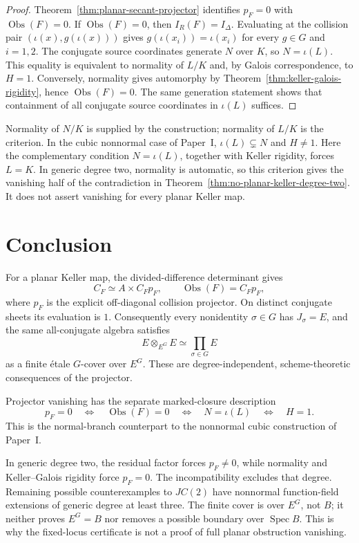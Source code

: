 \documentclass[11pt]{article}
\DeclareMathOperator{\Spec}{Spec}\DeclareMathOperator{\Frac}{Frac}
\newcommand{\Obs}{\operatorname{Obs}}
\begin{document}
\begin{proof}
Theorem~\ref{thm:planar-secant-projector} identifies \(p_F=0\) with
\(\Obs(F)=0\).  If \(\Obs(F)=0\), then \(I_R(F)=I_\Delta\).
Evaluating at the collision pair \((\iota(x),g(\iota(x)))\) gives
\(g(\iota(x_i))=\iota(x_i)\) for every \(g\in G\) and \(i=1,2\).
The conjugate source coordinates generate \(N\) over \(K\), so
\(N=\iota(L)\).  This equality is equivalent to normality of \(L/K\)
and, by Galois correspondence, to \(H=1\).  Conversely, normality gives
automorphy by Theorem~\ref{thm:keller-galois-rigidity}, hence
\(\Obs(F)=0\).  The same generation statement shows that containment
of all conjugate source coordinates in \(\iota(L)\) suffices.
\end{proof}

Normality of \(N/K\) is supplied by the construction; normality of
\(L/K\) is the criterion.  In the cubic nonnormal case of Paper~I,
\(\iota(L)\subsetneq N\) and \(H\ne1\).  Here the complementary
condition \(N=\iota(L)\), together with Keller rigidity, forces
\(L=K\).  In generic degree two, normality is automatic, so this
criterion gives the vanishing half of the contradiction in
Theorem~\ref{thm:no-planar-keller-degree-two}.  It does not assert
vanishing for every planar Keller map.

\section{Conclusion}
\label{sec:conclusion}

For a planar Keller map, the divided-difference determinant gives
\[
  C_F\simeq A\times C_Fp_F,\qquad
  \Obs(F)=C_Fp_F,
\]
where \(p_F\) is the explicit off-diagonal collision projector.  On
distinct conjugate sheets its evaluation is \(1\).  Consequently every
nonidentity \(\sigma\in G\) has \(J_\sigma=E\), and the same
all-conjugate algebra satisfies
\[
  E\otimes_{E^G}E\simeq\prod_{\sigma\in G}E
\]
as a finite \'etale \(G\)-cover over \(E^G\).  These are
degree-independent, scheme-theoretic consequences of the projector.

Projector vanishing has the separate marked-closure description
\[
  p_F=0
  \quad\Longleftrightarrow\quad\Obs(F)=0
  \quad\Longleftrightarrow\quad N=\iota(L)
  \quad\Longleftrightarrow\quad H=1.
\]
This is the normal-branch counterpart to the nonnormal cubic construction
of Paper~I.

In generic degree two, the residual factor forces \(p_F\neq0\), while
normality and Keller--Galois rigidity force \(p_F=0\).  The incompatibility
excludes that degree.  Remaining possible counterexamples to \(JC(2)\)
have nonnormal function-field extensions of generic degree at least three.
The finite cover is over \(E^G\), not \(B\); it neither proves
\(E^G=B\) nor removes a possible boundary over \(\Spec B\).
This is why the fixed-locus certificate is not a proof of full
planar obstruction vanishing.
\end{document}
